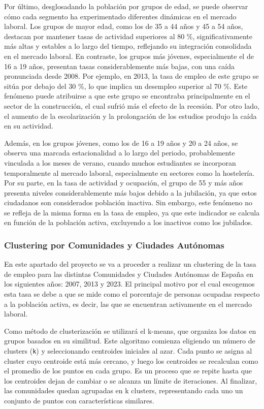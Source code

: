 \documentclass[notspecified,article,submit,moreauthors,pdftex]{Definitions/mdpi}
\begin{document}
Por último, desglosadando la población por grupos de edad, se puede
observar cómo cada segmento ha experimentado diferentes dinámicas en el
mercado laboral. Los grupos de mayor edad, como los de 35 a 44 años y 45
a 54 años, destacan por mantener tasas de actividad superiores al 80 \%,
significativamente más altas y estables a lo largo del tiempo,
reflejando su integración consolidada en el mercado laboral. En
contraste, los grupos más jóvenes, especialmente el de 16 a 19 años,
presentan tasas considerablemente más bajas, con una caída pronunciada
desde 2008. Por ejemplo, en 2013, la tasa de empleo de este grupo se
sitúa por debajo del 30 \%, lo que implica un desempleo superior al 70
\%. Este fenómeno puede atribuirse a que este grupo se encontraba
principalmente en el sector de la construcción, el cual sufrió más el
efecto de la recesión. Por otro lado, el aumento de la escolarización y
la prolongación de los estudios produjo la caída en su actividad.

Además, en los grupos jóvenes, como los de 16 a 19 años y 20 a 24 años,
se observa una marcada estacionalidad a lo largo del periodo,
probablemente vinculada a los meses de verano, cuando muchos estudiantes
se incorporan temporalmente al mercado laboral, especialmente en
sectores como la hostelería. Por su parte, en la tasa de actividad y
ocupación, el grupo de 55 y más años presenta niveles considerablemente
más bajos debido a la jubilación, ya que estos ciudadanos son
considerados población inactiva. Sin embargo, este fenómeno no se
refleja de la misma forma en la tasa de empleo, ya que este indicador se
calcula en función de la población activa, excluyendo a los inactivos
como los jubilados.

\subsubsection{Clustering por Comunidades y Ciudades
Autónomas}\label{clustering-por-comunidades-y-ciudades-autuxf3nomas}

En este apartado del proyecto se va a proceder a realizar un clustering
de la tasa de empleo para las distintas Comunidades y Ciudades Autónomas
de España en los siguientes años: 2007, 2013 y 2023. El principal motivo
por el cual escogemos esta tasa se debe a que se mide como el porcentaje
de personas ocupadas respecto a la población activa, es decir, las que
se encuentran activamente en el mercado laboral.

Como método de clusterización se utilizará el k-means, que organiza los
datos en grupos basados en su similitud. Este algoritmo comienza
eligiendo un número de clusters (\texttt{k}) y seleccionando centroides
iniciales al azar. Cada punto se asigna al cluster cuyo centroide está
más cercano, y luego los centroides se recalculan como el promedio de
los puntos en cada grupo. Es un proceso que se repite hasta que los
centroides dejan de cambiar o se alcanza un límite de iteraciones. Al
finalizar, las comunidades quedan agrupadas en k clusters, representando
cada uno un conjunto de puntos con características similares.
\end{document}
